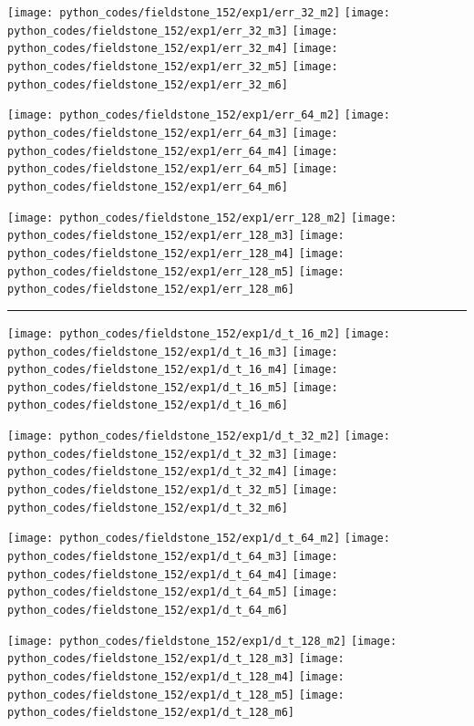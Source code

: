 \noindent
\texttt{[image: python\_codes/fieldstone\_152/exp1/err\_32\_m2]}
\texttt{[image: python\_codes/fieldstone\_152/exp1/err\_32\_m3]}
\texttt{[image: python\_codes/fieldstone\_152/exp1/err\_32\_m4]}
\texttt{[image: python\_codes/fieldstone\_152/exp1/err\_32\_m5]}
\texttt{[image: python\_codes/fieldstone\_152/exp1/err\_32\_m6]}

\noindent
\texttt{[image: python\_codes/fieldstone\_152/exp1/err\_64\_m2]}
\texttt{[image: python\_codes/fieldstone\_152/exp1/err\_64\_m3]}
\texttt{[image: python\_codes/fieldstone\_152/exp1/err\_64\_m4]}
\texttt{[image: python\_codes/fieldstone\_152/exp1/err\_64\_m5]}
\texttt{[image: python\_codes/fieldstone\_152/exp1/err\_64\_m6]}

\noindent
\texttt{[image: python\_codes/fieldstone\_152/exp1/err\_128\_m2]}
\texttt{[image: python\_codes/fieldstone\_152/exp1/err\_128\_m3]}
\texttt{[image: python\_codes/fieldstone\_152/exp1/err\_128\_m4]}
\texttt{[image: python\_codes/fieldstone\_152/exp1/err\_128\_m5]}
\texttt{[image: python\_codes/fieldstone\_152/exp1/err\_128\_m6]}

\hrule

\noindent
\texttt{[image: python\_codes/fieldstone\_152/exp1/d\_t\_16\_m2]}
\texttt{[image: python\_codes/fieldstone\_152/exp1/d\_t\_16\_m3]}
\texttt{[image: python\_codes/fieldstone\_152/exp1/d\_t\_16\_m4]}
\texttt{[image: python\_codes/fieldstone\_152/exp1/d\_t\_16\_m5]}
\texttt{[image: python\_codes/fieldstone\_152/exp1/d\_t\_16\_m6]}

\noindent
\texttt{[image: python\_codes/fieldstone\_152/exp1/d\_t\_32\_m2]}
\texttt{[image: python\_codes/fieldstone\_152/exp1/d\_t\_32\_m3]}
\texttt{[image: python\_codes/fieldstone\_152/exp1/d\_t\_32\_m4]}
\texttt{[image: python\_codes/fieldstone\_152/exp1/d\_t\_32\_m5]}
\texttt{[image: python\_codes/fieldstone\_152/exp1/d\_t\_32\_m6]}

\noindent
\texttt{[image: python\_codes/fieldstone\_152/exp1/d\_t\_64\_m2]}
\texttt{[image: python\_codes/fieldstone\_152/exp1/d\_t\_64\_m3]}
\texttt{[image: python\_codes/fieldstone\_152/exp1/d\_t\_64\_m4]}
\texttt{[image: python\_codes/fieldstone\_152/exp1/d\_t\_64\_m5]}
\texttt{[image: python\_codes/fieldstone\_152/exp1/d\_t\_64\_m6]}

\noindent
\texttt{[image: python\_codes/fieldstone\_152/exp1/d\_t\_128\_m2]}
\texttt{[image: python\_codes/fieldstone\_152/exp1/d\_t\_128\_m3]}
\texttt{[image: python\_codes/fieldstone\_152/exp1/d\_t\_128\_m4]}
\texttt{[image: python\_codes/fieldstone\_152/exp1/d\_t\_128\_m5]}
\texttt{[image: python\_codes/fieldstone\_152/exp1/d\_t\_128\_m6]}

